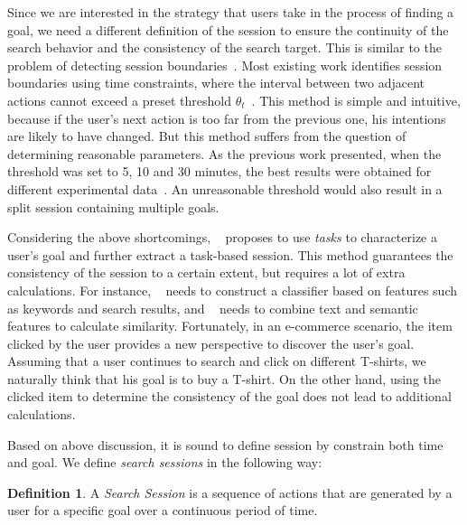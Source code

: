 \documentclass[sigconf,anonymous]{acmart}
\theoremstyle{definition}
\newtheorem{mydef}{Definition}
\begin{document}
Since we are interested in the strategy that users take in the process of finding a goal, we need a different definition of the session to ensure the continuity of the search behavior and the consistency of the search target. This is similar to the problem of detecting session boundaries~\cite{Silverstein1999Analysis,He2002Combining,Jansen2006How,Jones2008Beyond,Lucchese2011Identifying,Liao2012Evaluating}. Most existing work identifies session boundaries using time constraints, where the interval between two adjacent actions cannot exceed a preset threshold $\theta_t$~\cite{Silverstein1999Analysis,He2002Combining,Jansen2006How}. This method is simple and intuitive, because if the user's next action is too far from the previous one, his intentions are likely to have changed. But this method suffers from the question of determining reasonable parameters. As the previous work presented, when the threshold was set to 5, 10 and 30 minutes, the best results were obtained for different experimental data~\cite{Silverstein1999Analysis,He2002Combining,Jansen2006How}. An unreasonable threshold would also result in a split session containing multiple goals.

Considering the above shortcomings, ~\cite{Jones2008Beyond,Lucchese2011Identifying,Liao2012Evaluating} proposes to use \emph{tasks} to characterize a user's goal and further extract a task-based session. This method guarantees the consistency of the session to a certain extent, but requires a lot of extra calculations. For instance, ~\cite{Jones2008Beyond} needs to construct a classifier based on features such as keywords and search results, and ~\cite{Lucchese2011Identifying} needs to combine text and semantic features to calculate similarity. Fortunately, in an e-commerce scenario, the item clicked by the user provides a new perspective to discover the user's goal. Assuming that a user continues to search and click on different T-shirts, we naturally think that his goal is to buy a T-shirt. On the other hand, using the clicked item to determine the consistency of the goal does not lead to additional calculations.

Based on above discussion, it is sound to define session by constrain both time and goal. We define \emph{search sessions} in the following way:
\begin{mydef}\label{def:session}
A \emph{Search Session} is a sequence of actions that are generated by a user for a specific goal over a continuous period of time.
\end{mydef}
\end{document}
